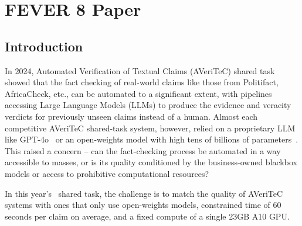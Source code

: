 
\chapter{FEVER 8 Paper}

\section{Introduction}
In 2024, Automated Verification of Textual Claims (AVeriTeC) shared task~\cite{schlichtkrull-etal-2024-automated} showed that the fact checking of real-world claims like those from Politifact, AfricaCheck, etc., can be automated to a significant extent, with pipelines accessing Large Language Models (LLMs) to produce the evidence and veracity verdicts for previously unseen claims instead of a human.
Almost each competitive AVeriTeC shared-task system, however, relied on a proprietary LLM like GPT-4o~\cite{rothermel-etal-2024-infact,ullrich-etal-2024-aic} or an open-weights model with high tens of billions of parameters~\cite{yoon-etal-2024-hero}.
This raised a concern -- can the fact-checking process be automated in a way accessible to masses, or is its quality conditioned by the business-owned blackbox models or access to prohibitive computational resources?

In this year's~\averitec{} shared task, the challenge is to match the quality of AVeriTeC systems with ones that only use open-weights models, constrained time of 60 seconds per claim on average, and a fixed compute of a single 23GB A10 GPU.

